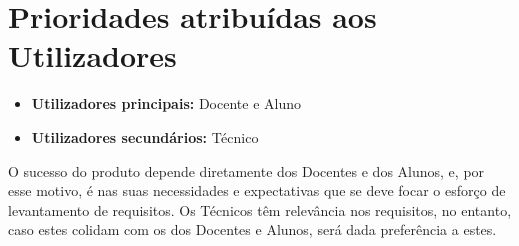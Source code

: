\section*{Prioridades atribuídas aos Utilizadores}
{\TextoCor
\begin{itemize}
    \item \textbf{Utilizadores principais:} Docente e Aluno
    \item \textbf{Utilizadores secundários:} Técnico
\end{itemize}

O sucesso do produto depende diretamente dos Docentes e dos Alunos, e, por esse motivo, é nas suas necessidades e expectativas que se deve focar o esforço de levantamento de requisitos.
Os Técnicos têm relevância nos requisitos, no entanto, caso estes colidam com os dos Docentes e Alunos, será dada preferência a estes.
}